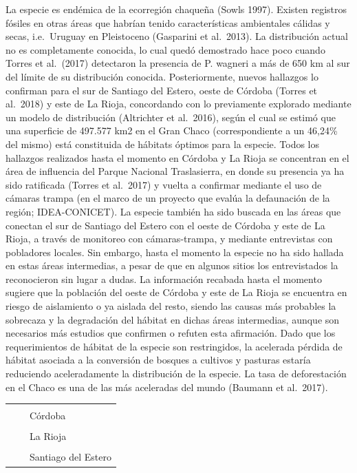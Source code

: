 \documentclass[
  x11names]{article}
\begin{document}
La especie es endémica de la ecorregión chaqueña (Sowls 1997). Existen
registros fósiles en otras áreas que habrían tenido características
ambientales cálidas y secas, i.e.~Uruguay en Pleistoceno (Gasparini et
al.~2013). La distribución actual no es completamente conocida, lo cual
quedó demostrado hace poco cuando Torres et al.~(2017) detectaron la
presencia de P. wagneri a más de 650 km al sur del límite de su
distribución conocida. Posteriormente, nuevos hallazgos lo confirman
para el sur de Santiago del Estero, oeste de Córdoba (Torres et
al.~2018) y este de La Rioja, concordando con lo previamente explorado
mediante un modelo de distribución (Altrichter et al.~2016), según el
cual se estimó que una superficie de 497.577 km2 en el Gran Chaco
(correspondiente a un 46,24\% del mismo) está constituida de hábitats
óptimos para la especie. Todos los hallazgos realizados hasta el momento
en Córdoba y La Rioja se concentran en el área de influencia del Parque
Nacional Traslasierra, en donde su presencia ya ha sido ratificada
(Torres et al.~2017) y vuelta a confirmar mediante el uso de cámaras
trampa (en el marco de un proyecto que evalúa la defaunación de la
región; IDEA-CONICET). La especie también ha sido buscada en las áreas
que conectan el sur de Santiago del Estero con el oeste de Córdoba y
este de La Rioja, a través de monitoreo con cámaras-trampa, y mediante
entrevistas con pobladores locales. Sin embargo, hasta el momento la
especie no ha sido hallada en estas áreas intermedias, a pesar de que en
algunos sitios los entrevistados la reconocieron sin lugar a dudas. La
información recabada hasta el momento sugiere que la población del oeste
de Córdoba y este de La Rioja se encuentra en riesgo de aislamiento o ya
aislada del resto, siendo las causas más probables la sobrecaza y la
degradación del hábitat en dichas áreas intermedias, aunque son
necesarios más estudios que confirmen o refuten esta afirmación. Dado
que los requerimientos de hábitat de la especie son restringidos, la
acelerada pérdida de hábitat asociada a la conversión de bosques a
cultivos y pasturas estaría reduciendo aceleradamente la distribución de
la especie. La tasa de deforestación en el Chaco es una de las más
aceleradas del mundo (Baumann et al.~2017).

\begin{tabu} to 
\toprule
\textbf{} &  & \\
\textbf{} &  & Córdoba\\
\textbf{} &  & \\
\textbf{} &  & La Rioja\\
\textbf{} &  & \\
\textbf{} &  & Santiago del Estero\\
\bottomrule
\end{tabu}
\end{document}
